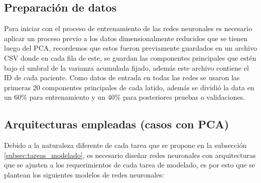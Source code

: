 \documentclass[12pt,letterpaper,oneside,openright]{book}
\begin{document}
\subsection{Preparación de datos}

Para iniciar con el proceso de entrenamiento de las redes neuronales es necesario aplicar un proceso previo a los datos dimensionalmente reducidos que se tienen luego del PCA, recordemos que estos fueron previamente guardados en un archivo CSV donde en cada fila de este, se guardan las componentes principales que estén bajo el umbral de la varianza acumulada fijado, además este archivo contiene el ID de cada paciente. Como datos de entrada en todas las redes se usaron las primeras 20 componentes principales de cada latido, además se dividió la data en un 60\% para entrenamiento y un 40\% para posteriores pruebas o validaciones. 

\subsection{Arquitecturas empleadas (casos con PCA)}

Debido a la naturaleza diferente de cada tarea que se propone en la subsección \ref{subsec:tareas_modelado}, es necesario diseñar redes neuronales con arquitecturas que se ajusten a los requerimientos de cada tarea de modelado, es por esto que se plantean los siguientes modelos de redes neuronales:
\end{document}
